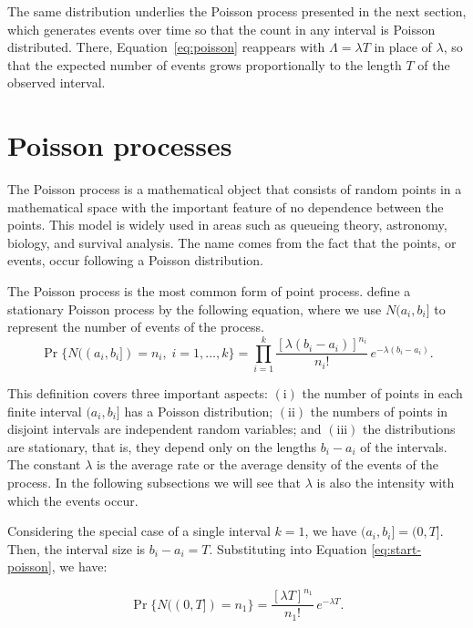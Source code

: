     The same distribution underlies the Poisson process presented in the next section, which generates events over time so that the count in any interval is Poisson distributed. There, Equation~\eqref{eq:poisson} reappears with $\Lambda = \lambda T$ in place of $\lambda$, so that the expected number of events grows proportionally to the length $T$ of the observed interval.


\section{Poisson processes}\label{sec:processos-de-poisson}

    The Poisson process is a mathematical object that consists of random points in a mathematical space with the important feature of no dependence between the points. This model is widely used in areas such as queueing theory, astronomy, biology, and survival analysis. The name comes from the fact that the points, or events, occur following a Poisson distribution.

    The Poisson process is the most common form of point process.  define a stationary Poisson process by the following equation, where we use $N(a_i, b_i]$ to represent the number of events of the process.
    \begin{equation}
        \Pr\{N((a_i, b_i]) = n_i,\; i = 1, \ldots, k\}
        =
        \prod_{i=1}^{k}
        \frac{[\lambda (b_i - a_i)]^{n_i}}{n_i!}\,
        e^{-\lambda (b_i - a_i)}.
        \label{eq:start-poisson}
    \end{equation}

    This definition covers three important aspects: $(\mathrm{i})$ the number of points in each finite interval $(a_i,b_i]$ has a Poisson distribution; $(\mathrm{ii})$ the numbers of points in disjoint intervals are independent random variables; and $(\mathrm{iii})$ the distributions are stationary, that is, they depend only on the lengths $b_i-a_i$ of the intervals. The constant $\lambda$ is the average rate or the average density of the events of the process. In the following subsections we will see that $\lambda$ is also the intensity with which the events occur.

    Considering the special case of a single interval $k=1$, we have $(a_i, b_i] = (0,T]$. Then, the interval size is $b_i-a_i=T$. Substituting into Equation \ref{eq:start-poisson}, we have:

    \begin{equation}
        \Pr\{N((0,T]) = n_1\}
        = \frac{[\lambda T]^{n_1}}{n_1!}\,
        e^{-\lambda T}.
        \label{eq:poisson-lambda}
    \end{equation}

